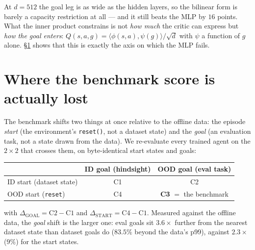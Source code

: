 \documentclass[11pt]{article}
\newcommand{\B}[1]{\textbf{#1}}
\begin{document}
\noindent At $d{=}512$ the goal leg is as wide as the hidden layers, so the bilinear form is
barely a capacity restriction at all --- and it still beats the MLP by $16$ points. What the
inner product constrains is not \emph{how much} the critic can express but \emph{how the goal
enters}: $Q(s,a,g)=\langle\phi(s,a),\psi(g)\rangle/\sqrt d$ with $\psi$ a function of $g$
alone. \S\ref{sec:ood} shows that this is exactly the axis on which the MLP fails.

\section{Where the benchmark score is actually lost}
\label{sec:ood}

The benchmark shifts two things at once relative to the offline data: the episode
\emph{start} (the environment's \texttt{reset()}, not a dataset state) and the \emph{goal}
(an evaluation task, not a state drawn from the data). We re-evaluate every trained agent on
the $2{\times}2$ that crosses them, on byte-identical start states and goals:

\begin{center}\footnotesize
\begin{tabular}{@{}l c c@{}}
\toprule
 & ID goal (hindsight) & OOD goal (eval task) \\
\midrule
ID start (dataset state)   & C1 & C2 \\
OOD start (\texttt{reset}) & C4 & \B{C3} $=$ the benchmark \\
\bottomrule
\end{tabular}
\end{center}

\noindent with $\Delta_{\text{GOAL}}{=}\text{C2}{-}\text{C1}$ and
$\Delta_{\text{START}}{=}\text{C4}{-}\text{C1}$. Measured against the offline data, the
\emph{goal} shift is the larger one: eval goals sit $3.6\times$ further from the nearest
dataset state than dataset goals do ($83.5\%$ beyond the data's p99), against $2.3\times$
($9\%$) for the start states.
\end{document}
